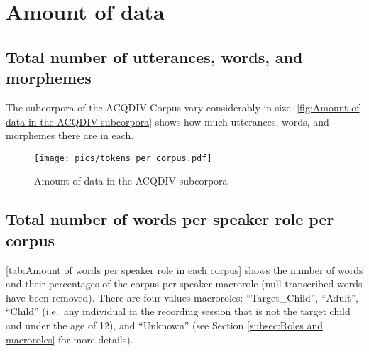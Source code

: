 \documentclass[a4paper, 11pt]{book}
\begin{document}
%

\newpage

\section{Amount of data}
\label{sec:Amount of data}

\subsection{Total number of utterances, words, and morphemes}
The subcorpora of the ACQDIV Corpus vary considerably in size. \autoref{fig:Amount of data in the ACQDIV subcorpora} shows how much utterances, words, and morphemes there are in each. 

\begin{figure}[ht!]
	\centering
	\texttt{[image: pics/tokens\_per\_corpus.pdf]}
	\caption{Amount of data in the ACQDIV subcorpora}
	\label{fig:Amount of data in the ACQDIV subcorpora}
\end{figure}

\subsection{Total number of words per speaker role per corpus}
\begin{comment}
https://github.com/uzling/acqdiv/blob/master/acqdiv/database/dump_production.sh
select corpus, count(distinct(word_id)) 
from export
where word is not NULL
and macrorole != "Adult"
group by corpus
\end{comment}

\autoref{tab:Amount of words per speaker role in each corpus} shows the number of words and their percentages of the corpus per speaker macrorole (null transcribed words have been removed). There are four values macroroles: ``Target\_Child'', ``Adult'', ``Child'' (i.e.\ any individual in the recording session that is not the target child and under the age of 12), and ``Unknown'' (see Section \ref{subsec:Roles and macroroles} for more details).
\end{document}
